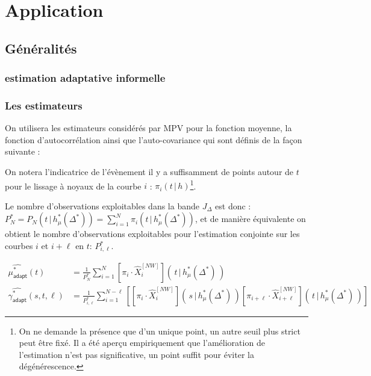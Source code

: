 \chapter{
  Application
 }
\minitoc%

\section{Généralités}

\subsection{estimation adaptative informelle}

\subsection{Les estimateurs}


On utilisera les estimateurs considérés par MPV \cite{maissoro-SmoothnessFTSweakDep} pour la fonction moyenne, la fonction d'autocorrélation ainsi que l'auto-covariance qui sont définis de la façon suivante :

\noindent On notera l'indicatrice de l'évènement \og il y a suffisamment de points autour de $t$ pour le lissage à noyaux de la courbe $i$ \fg : $\pi_i(t \, | \, h)$\footnote{On ne demande la présence que d'un unique point, un autre seuil plus strict peut être fixé. Il a été aperçu empiriquement que l'amélioration de l'estimation n'est pas significative, un point suffit pour éviter la dégénérescence.}.

\noindent Le nombre d'observations exploitables dans la bande $J_\Delta$ est donc : $P_N^* =P_N(t \, | \, h_\mu^*(\Delta^*)) = \sum\limits_{i=1}^N \pi_i(t \, | \, h_\mu^*(\Delta^*))$, et de manière équivalente on obtient le nombre d'observations exploitables pour l'estimation conjointe sur les courbes $i$ et $i + \ell$ en $t$: $P_{i,\ell}^*$.

\begin{align}
	\widehat{\mu^*_{\textsf{adapt}}}(t)              & = \frac 1 {P_N^*} \sum_{i=1}^N \left[\pi_i \cdot \widehat X^{[NW]}_i\right]\left(\, t \, | \, h^*_\mu(\Delta^*) \, \right) \\
	\widehat {\gamma^*_{\textsf{adapt}}}(s, t, \ell) & = \frac 1 {P^*_{i, \ell}}\sum_{i=1}^{N- \ell} \left[
		\left[\pi_i \cdot \widehat X^{[NW]}_i\right]\left(\, s \, | \, h^*_\mu(\Delta^*) \, \right) \left[\pi_{i + \ell} \cdot \widehat X^{[NW]}_{i + \ell}\right]\left(\, t \, | \, h^*_\mu(\Delta^*) \, \right)
		\right]                                                                                                                                                                       %
\end{align}

